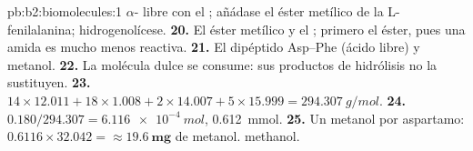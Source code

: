 \begin{solution}{pb:b2:biomolecules:1}
$\alpha$- libre con el ; añádase el éster metílico de la L-fenilalanina; hidrogenolícese.
\textbf{20.} El éster metílico y el ; primero el éster, pues una amida es mucho menos reactiva.
\textbf{21.} El dipéptido Asp--Phe (ácido libre) y metanol.
\textbf{22.} La molécula dulce se consume: sus productos de hidrólisis no la sustituyen.
\textbf{23.} $14 \times 12.011 + 18 \times 1.008 + 2 \times 14.007 + 5 \times 15.999 =
\qty{294.307}{g/mol}$.
\textbf{24.} $0.180/294.307 = \qty{6.116e-4}{mol}$, \qty{0.612}{mmol}.
\textbf{25.} Un metanol por aspartamo: $0.6116 \times 32.042 = \boldsymbol{\approx \qty{19.6}{mg}}$ de
metanol.
methanol.
\end{solution}
